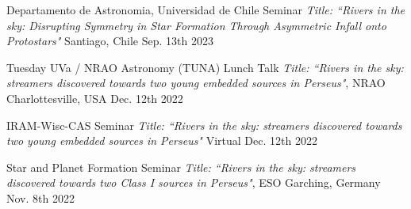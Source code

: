 


\begin{cvhonors}
		 \cvhonor
	{Departamento de Astronomia, Universidad de Chile Seminar} %
	{\textit{Title: ``Rivers in the sky:  Disrupting Symmetry in Star Formation Through Asymmetric Infall onto Protostars"}} %
	{Santiago, Chile} %
	{Sep. 13th 2023} %
	
	 \cvhonor
	{Tuesday UVa / NRAO Astronomy (TUNA) Lunch Talk} %
	{\textit{Title: ``Rivers in the sky: streamers discovered towards two young embedded sources in Perseus"}, NRAO} %
	{Charlottesville, USA} %
	{Dec. 12th 2022} %
	
	 \cvhonor
	{IRAM-Wisc-CAS Seminar} %
	{\textit{Title: ``Rivers in the sky: streamers discovered towards two young embedded sources in Perseus"}} %
	{Virtual} %
	{Dec. 12th 2022} %
	
	 \cvhonor
	{Star and Planet Formation Seminar} %
	{\textit{Title: ``Rivers in the sky: streamers discovered towards two Class I sources in Perseus"}, ESO} %
	{Garching, Germany} %
	{Nov. 8th 2022} %
	
\end{cvhonors}


